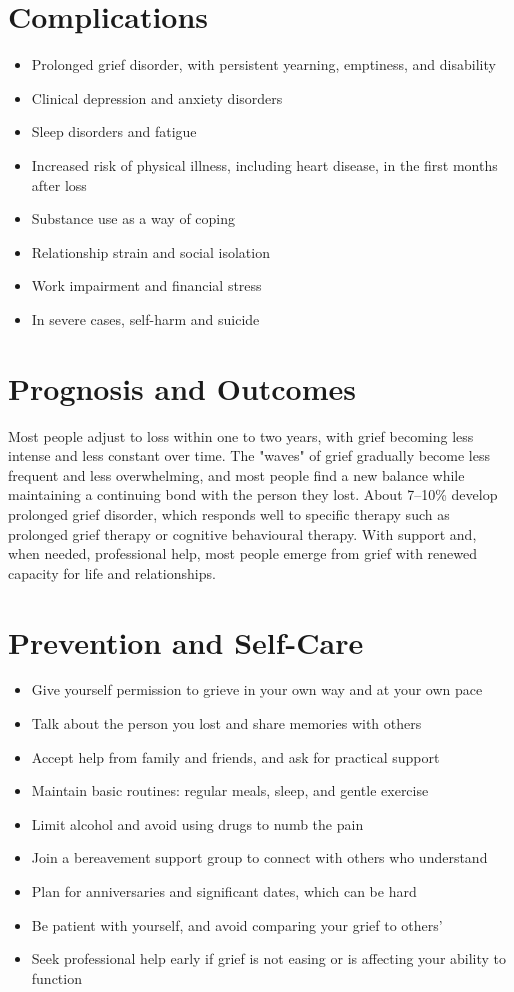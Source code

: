\section*{Complications}
\begin{itemize}
    \item Prolonged grief disorder, with persistent yearning, emptiness, and disability
    \item Clinical depression and anxiety disorders
    \item Sleep disorders and fatigue
    \item Increased risk of physical illness, including heart disease, in the first months after loss
    \item Substance use as a way of coping
    \item Relationship strain and social isolation
    \item Work impairment and financial stress
    \item In severe cases, self-harm and suicide
\end{itemize}

\section*{Prognosis and Outcomes}
Most people adjust to loss within one to two years, with grief becoming less intense and less constant over time. The "waves" of grief gradually become less frequent and less overwhelming, and most people find a new balance while maintaining a continuing bond with the person they lost. About 7--10\% develop prolonged grief disorder, which responds well to specific therapy such as prolonged grief therapy or cognitive behavioural therapy. With support and, when needed, professional help, most people emerge from grief with renewed capacity for life and relationships.

\section*{Prevention and Self-Care}
\begin{itemize}
    \item Give yourself permission to grieve in your own way and at your own pace
    \item Talk about the person you lost and share memories with others
    \item Accept help from family and friends, and ask for practical support
    \item Maintain basic routines: regular meals, sleep, and gentle exercise
    \item Limit alcohol and avoid using drugs to numb the pain
    \item Join a bereavement support group to connect with others who understand
    \item Plan for anniversaries and significant dates, which can be hard
    \item Be patient with yourself, and avoid comparing your grief to others'
    \item Seek professional help early if grief is not easing or is affecting your ability to function
\end{itemize}

